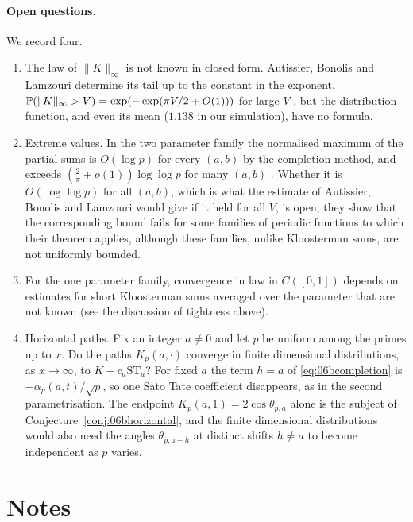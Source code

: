 \paragraph{Open questions.} We record four.
\begin{enumerate}
\item The law of $\|K\|_\infty$ is not known in closed form. Autissier, Bonolis and Lamzouri determine its tail up to the constant in the exponent, $\mathbb{P}(\|K\|_\infty>V)=\exp(-\exp(\pi V/2+O(1)))$ for large $V$ \cite{abl2021}, but the distribution function, and even its mean ($1.138$ in our simulation), have no formula.
\item Extreme values. In the two parameter family the normalised maximum of the partial sums is $O(\log p)$ for every $(a,b)$ by the completion method, and exceeds $(\frac2\pi+o(1))\log\log p$ for many $(a,b)$ \cite{abl2021}. Whether it is $O(\log\log p)$ for all $(a,b)$, which is what the estimate of Autissier, Bonolis and Lamzouri would give if it held for all $V$, is open; they show that the corresponding bound fails for some families of periodic functions to which their theorem applies, although these families, unlike Kloosterman sums, are not uniformly bounded.
\item For the one parameter family, convergence in law in $C([0,1])$ depends on estimates for short Kloosterman sums averaged over the parameter that are not known (see the discussion of tightness above).
\item Horizontal paths. Fix an integer $a\ne0$ and let $p$ be uniform among the primes up to $x$. Do the paths $K_p(a,\cdot)$ converge in finite dimensional distributions, as $x\to\infty$, to $K-c_a\mathrm{ST}_a$? For fixed $a$ the term $h=a$ of \eqref{eq:06bcompletion} is $-\alpha_p(a,t)/\sqrt p$, so one Sato Tate coefficient disappears, as in the second parametrisation. The endpoint $K_p(a,1)=2\cos\theta_{p,a}$ alone is the subject of Conjecture~\ref{conj:06bhorizontal}, and the finite dimensional distributions would also need the angles $\theta_{p,a-h}$ at distinct shifts $h\ne a$ to become independent as $p$ varies.
\end{enumerate}

\section{Notes}

